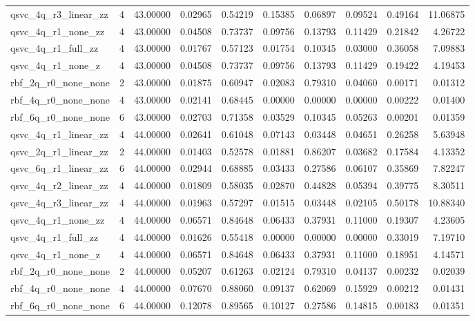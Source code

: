 \begin{table}
\begin{tabular}{lrrrrrrrrr}
qsvc\_4q\_r3\_linear\_zz & 4 & 43.00000 & 0.02965 & 0.54219 & 0.15385 & 0.06897 & 0.09524 & 0.49164 & 11.06875 \\
qsvc\_4q\_r1\_none\_zz & 4 & 43.00000 & 0.04508 & 0.73737 & 0.09756 & 0.13793 & 0.11429 & 0.21842 & 4.26722 \\
qsvc\_4q\_r1\_full\_zz & 4 & 43.00000 & 0.01767 & 0.57123 & 0.01754 & 0.10345 & 0.03000 & 0.36058 & 7.09883 \\
qsvc\_4q\_r1\_none\_z & 4 & 43.00000 & 0.04508 & 0.73737 & 0.09756 & 0.13793 & 0.11429 & 0.19422 & 4.19453 \\
rbf\_2q\_r0\_none\_none & 2 & 43.00000 & 0.01875 & 0.60947 & 0.02083 & 0.79310 & 0.04060 & 0.00171 & 0.01312 \\
rbf\_4q\_r0\_none\_none & 4 & 43.00000 & 0.02141 & 0.68445 & 0.00000 & 0.00000 & 0.00000 & 0.00222 & 0.01400 \\
rbf\_6q\_r0\_none\_none & 6 & 43.00000 & 0.02703 & 0.71358 & 0.03529 & 0.10345 & 0.05263 & 0.00201 & 0.01359 \\
qsvc\_4q\_r1\_linear\_zz & 4 & 44.00000 & 0.02641 & 0.61048 & 0.07143 & 0.03448 & 0.04651 & 0.26258 & 5.63948 \\
qsvc\_2q\_r1\_linear\_zz & 2 & 44.00000 & 0.01403 & 0.52578 & 0.01881 & 0.86207 & 0.03682 & 0.17584 & 4.13352 \\
qsvc\_6q\_r1\_linear\_zz & 6 & 44.00000 & 0.02944 & 0.68885 & 0.03433 & 0.27586 & 0.06107 & 0.35869 & 7.82247 \\
qsvc\_4q\_r2\_linear\_zz & 4 & 44.00000 & 0.01809 & 0.58035 & 0.02870 & 0.44828 & 0.05394 & 0.39775 & 8.30511 \\
qsvc\_4q\_r3\_linear\_zz & 4 & 44.00000 & 0.01963 & 0.57297 & 0.01515 & 0.03448 & 0.02105 & 0.50178 & 10.88340 \\
qsvc\_4q\_r1\_none\_zz & 4 & 44.00000 & 0.06571 & 0.84648 & 0.06433 & 0.37931 & 0.11000 & 0.19307 & 4.23605 \\
qsvc\_4q\_r1\_full\_zz & 4 & 44.00000 & 0.01626 & 0.55418 & 0.00000 & 0.00000 & 0.00000 & 0.33019 & 7.19710 \\
qsvc\_4q\_r1\_none\_z & 4 & 44.00000 & 0.06571 & 0.84648 & 0.06433 & 0.37931 & 0.11000 & 0.18951 & 4.14571 \\
rbf\_2q\_r0\_none\_none & 2 & 44.00000 & 0.05207 & 0.61263 & 0.02124 & 0.79310 & 0.04137 & 0.00232 & 0.02039 \\
rbf\_4q\_r0\_none\_none & 4 & 44.00000 & 0.07670 & 0.88060 & 0.09137 & 0.62069 & 0.15929 & 0.00212 & 0.01431 \\
rbf\_6q\_r0\_none\_none & 6 & 44.00000 & 0.12078 & 0.89565 & 0.10127 & 0.27586 & 0.14815 & 0.00183 & 0.01351 \\
\bottomrule
\end{tabular}
\end{table}
